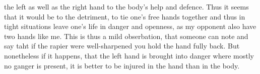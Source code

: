 the left as well as the right hand to the body's help and
defence. Thus it seems that it would be to the detriment, to tie one's
free hands together and thus in tight situations leave one's life in
danger and openness,
as my opponent also have two hands like me. This is thus a mild
obserbation, that someone can note and say taht if the rapier were
well-sharpened you hold the hand fully back. But nonetheless if it
happens, that the left hand is brought into danger where mostly no
ganger is present, it is better to be injured in the hand than in the
body.
